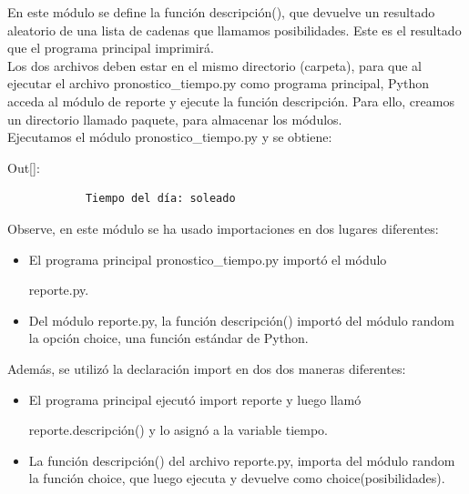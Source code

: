 En este módulo se define la función  {\ttfamily descripción()}, que devuelve un resultado aleatorio de una lista de cadenas que llamamos posibilidades. Este es el resultado que el programa principal imprimirá.\\

Los dos archivos deben estar en el mismo directorio (carpeta), para que al ejecutar el archivo {\ttfamily pronostico\_tiempo.py} como programa principal, Python acceda al módulo de {\ttfamily reporte} y ejecute la función {\ttfamily descripción}. 
Para ello, creamos un directorio llamado {\ttfamily paquete}, para  almacenar los módulos.\\

Ejecutamos el módulo  {\ttfamily pronostico\_tiempo.py} y se obtiene:\vspace{0.08cm}

{\ttfamily\scriptsize\noindent Out[]:\vspace{-0.3cm}	
	{\color{blue} 	
		\begin{verbatim}
			Tiempo del día: soleado	
		\end{verbatim}
}}

Observe, en este módulo se ha usado importaciones en dos lugares diferentes:

\begin{itemize}
	\item[\ding{51}]  El programa principal  {\ttfamily pronostico\_tiempo.py} importó el módulo 
	
	{\ttfamily reporte.py}.
	\item[\ding{51}]  Del módulo {\ttfamily reporte.py}, la función {\ttfamily descripción()} importó del módulo  {\ttfamily random} la opción {\ttfamily choice}, una función estándar de Python.
\end{itemize}
Además,  se utilizó la declaración {\ttfamily import} en dos dos maneras diferentes:
\begin{itemize}	
	\item[\ding{51}] El programa principal ejecutó {\ttfamily import reporte} y luego llamó 
	
	{\ttfamily reporte.descripción()} y lo asignó a la variable {\ttfamily tiempo}.
	\item[\ding{51}] La función {\ttfamily descripción()} del archivo {\ttfamily reporte.py}, importa  del módulo  {\ttfamily random} la función  {\ttfamily choice}, que  luego ejecuta y devuelve como {\ttfamily choice(posibilidades)}.
\end{itemize}

